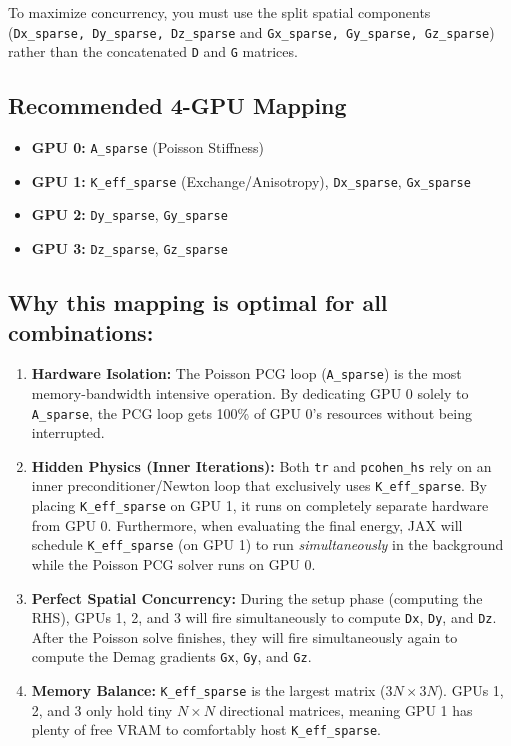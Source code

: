 \documentclass[12pt,a4paper]{article}
\begin{document}
To maximize concurrency, you must use the split spatial components (\texttt{Dx\_sparse, Dy\_sparse, Dz\_sparse} and \texttt{Gx\_sparse, Gy\_sparse, Gz\_sparse}) rather than the concatenated \texttt{D} and \texttt{G} matrices.

\subsection*{Recommended 4-GPU Mapping}
\begin{itemize}
    \item \textbf{GPU 0:} \texttt{A\_sparse} (Poisson Stiffness)
    \item \textbf{GPU 1:} \texttt{K\_eff\_sparse} (Exchange/Anisotropy), \texttt{Dx\_sparse}, \texttt{Gx\_sparse}
    \item \textbf{GPU 2:} \texttt{Dy\_sparse}, \texttt{Gy\_sparse}
    \item \textbf{GPU 3:} \texttt{Dz\_sparse}, \texttt{Gz\_sparse}
\end{itemize}

\subsection*{Why this mapping is optimal for all combinations:}
\begin{enumerate}
    \item \textbf{Hardware Isolation:} The Poisson PCG loop (\texttt{A\_sparse}) is the most memory-bandwidth intensive operation. By dedicating GPU 0 solely to \texttt{A\_sparse}, the PCG loop gets 100\% of GPU 0's resources without being interrupted.
    \item \textbf{Hidden Physics (Inner Iterations):} Both \texttt{tr} and \texttt{pcohen\_hs} rely on an inner preconditioner/Newton loop that exclusively uses \texttt{K\_eff\_sparse}. By placing \texttt{K\_eff\_sparse} on GPU 1, it runs on completely separate hardware from GPU 0. Furthermore, when evaluating the final energy, JAX will schedule \texttt{K\_eff\_sparse} (on GPU 1) to run \textit{simultaneously} in the background while the Poisson PCG solver runs on GPU 0.
    \item \textbf{Perfect Spatial Concurrency:} During the setup phase (computing the RHS), GPUs 1, 2, and 3 will fire simultaneously to compute \texttt{Dx}, \texttt{Dy}, and \texttt{Dz}. After the Poisson solve finishes, they will fire simultaneously again to compute the Demag gradients \texttt{Gx}, \texttt{Gy}, and \texttt{Gz}.
    \item \textbf{Memory Balance:} \texttt{K\_eff\_sparse} is the largest matrix ($3N \times 3N$). GPUs 1, 2, and 3 only hold tiny $N \times N$ directional matrices, meaning GPU 1 has plenty of free VRAM to comfortably host \texttt{K\_eff\_sparse}.
\end{enumerate}
\end{document}
